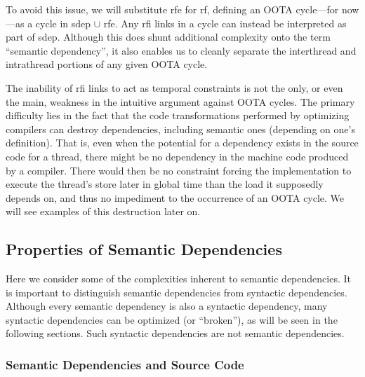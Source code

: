 To avoid this issue, we will substitute rfe
for rf, defining an OOTA cycle---for now---as a cycle in sdep $\cup$ rfe.
Any rfi links in a cycle can instead be interpreted as part of sdep.
Although this does shunt additional complexity onto the term
``semantic dependency'', it also enables us to cleanly separate
the interthread and intrathread portions of any given OOTA cycle.


The inability of rfi links to act as temporal constraints is not the
only, or even the main, weakness in the intuitive argument against
OOTA cycles.
The primary difficulty lies in the fact that the code transformations
performed by optimizing compilers can destroy dependencies, including
semantic ones (depending on one's definition).
That is, even when the potential for a dependency exists in the
source code for a thread, there might be no dependency in the machine
code produced by a compiler.
There would then be no constraint forcing the implementation to execute
the thread's store later in global time than the load it supposedly depends on,
and thus no impediment to the occurrence of an OOTA cycle.
We will see examples of this destruction later on.

\subsection{Properties of Semantic Dependencies}
\label{sec:Properties of Semantic Dependencies}

Here we consider some of the complexities inherent to semantic
dependencies.
It is important to distinguish semantic dependencies from syntactic
dependencies.
Although every semantic dependency is also a syntactic dependency, many
syntactic dependencies can be optimized (or ``broken''), as will be seen
in the following sections.
Such syntactic dependencies are not semantic dependencies.

\subsubsection{Semantic Dependencies and Source Code}
\label{sec:Semantic Dependencies and Source Code}

